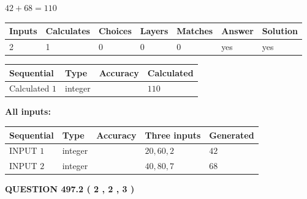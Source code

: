 \documentclass[12pt]{article}
\begin{document}
 

$ %
42 +  %
68=   %
110$
 
 
\noindent{}
 
 

 
   
   
   
   
\noindent\begin{tabular}{|l|l|l|l|l|l|l|}
 \hline
Inputs & Calculates & Choices & Layers & Matches & Answer & Solution \\ \hline
 2  & 
 1  & 
 0
  & 
 0  & 
 0  & 
  yes & 
  yes 
  \\ \hline
 \end{tabular}
   
   
   
   
\noindent{}
   
   
  
  
\noindent\begin{tabular}{|l|l|l|l|}
\hline
 Sequential & Type & Accuracy & Calculated \\ 
\hline
 
 
  Calculated $  1 $ & integer &  & 
  $ 110 $ 
 \\  \hline  
 \end{tabular}
   
   
   
   
\noindent\vspace{0.1in}\hspace{-0.08in} {\textbf{\Large{All inputs: }}}
   
   
  
  
\noindent\begin{tabular}{|l|l|l|l|l|}
\hline
 Sequential & Type & Accuracy & Three inputs & Generated \\ 
\hline
 
 
  INPUT $  1 $ & integer &  & $
 20
 , 
 60
 , 
 2
 $ & $ 42 $ 
 \\  \hline  
 
 
  INPUT $  2 $ & integer &  & $
 40
 , 
 80
 , 
 7
 $ & $ 68 $ 
 \\  \hline  
 \end{tabular}
   
   
  
\vspace{0.2in}
  
{\textbf{\Large{QUESTION
497.2 
 ( 2 , 2 , 3 )
}}}
  
\end{document}
